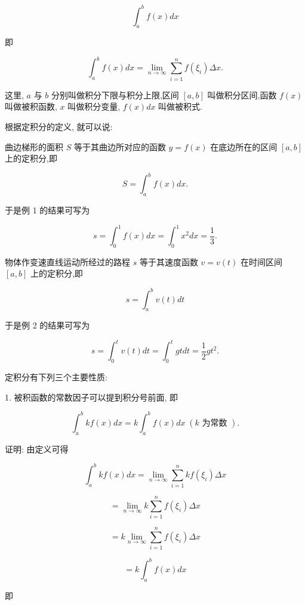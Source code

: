 \documentclass[lang=cn,newtx,10pt,scheme=chinese]{elegantbook}
\begin{document}
\[
{\int }_{a}^{b}f\left( x\right) {dx}
\]

即

\[
{\int }_{a}^{b}f\left( x\right) {dx} = \mathop{\lim }\limits_{{n \rightarrow \infty }}\mathop{\sum }\limits_{{i = 1}}^{n}f\left( {\xi }_{i}\right) {\Delta x}.
\]

这里, \(a\) 与 \(b\) 分别叫做积分下限与积分上限,区间 \(\left\lbrack {a,b}\right\rbrack\) 叫做积分区间,函数 \(f\left( x\right)\) 叫做被积函数, \(x\) 叫做积分变量, \(f\left( x\right) {dx}\) 叫做被积式.

根据定积分的定义, 就可以说:

曲边梯形的面积 \(S\) 等于其曲边所对应的函数 \(y = f\left( x\right)\) 在底边所在的区间 \(\left\lbrack {a,b}\right\rbrack\) 上的定积分,即

\[
S = {\int }_{a}^{b}f\left( x\right) {dx}.
\]

于是例 1 的结果可写为

\[
s = {\int }_{0}^{1}f\left( x\right) {dx} = {\int }_{0}^{1}{x}^{2}{dx} = \frac{1}{3}.
\]

物体作变速直线运动所经过的路程 \(s\) 等于其速度函数 \(v = v\left( t\right)\) 在时间区间 \(\left\lbrack {a,b}\right\rbrack\) 上的定积分,即

\[
s = {\int }_{a}^{b}v\left( t\right) {dt}
\]

于是例 2 的结果可写为

\[
s = {\int }_{0}^{t}v\left( t\right) {dt} = {\int }_{0}^{t}{gtdt} = \frac{1}{2}g{t}^{2}.
\]

定积分有下列三个主要性质:

1. 被积函数的常数因子可以提到积分号前面, 即

\[
{\int }_{a}^{b}{kf}\left( x\right) {dx} = k{\int }_{a}^{b}f\left( x\right) {dx}\;\left( {k\text{ 为常数 }}\right) .
\]

证明: 由定义可得

\[
{\int }_{a}^{b}{kf}\left( x\right) {dx} = \mathop{\lim }\limits_{{n \rightarrow \infty }}\mathop{\sum }\limits_{{i = 1}}^{n}{kf}\left( {\xi }_{i}\right) {\Delta x}
\]

\[
= \mathop{\lim }\limits_{{n \rightarrow \infty }}k\mathop{\sum }\limits_{{i = 1}}^{n}f\left( {\xi }_{i}\right) {\Delta x}
\]

\[
= k\mathop{\lim }\limits_{{n \rightarrow \infty }}\mathop{\sum }\limits_{{i = 1}}^{n}f\left( {\xi }_{i}\right) {\Delta x}
\]

\[
= k{\int }_{a}^{b}f\left( x\right) {dx}
\]

即
\end{document}
